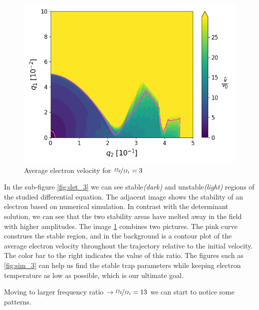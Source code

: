 \begin{figure}[H]
	\centering
	\includegraphics[width=\linewidth]{img/0_ions_1_electrons_q1_0.0-0.1_q2_0.0-0.5_960x960_3_1000.png}
	\caption{Average electron velocity for $\nicefrac{\Omega_2}{\Omega_1} = 3$}
	\label{fig:velocityedge-eta=3}
\end{figure}

In the sub-figure \ref{fig:det_3} we can see stable\textit{(dark)} and unstable\textit{(light)} regions of the studied differential equation. The adjacent image shows the stability of an electron based on numerical simulation. In contrast with the determinant solution, we can see that the two stability areas have melted away in the field with higher amplitudes. The image \ref{fig:velocityedge-eta=3} combines two pictures. The pink curve construes the stable region, and in the background is a contour plot of the average electron velocity throughout the trajectory relative to the initial velocity. The color bar to the right indicates the value of this ratio. The figures such as \ref{fig:sim_3} can help us find the stable trap parameters while keeping electron temperature as low as possible, which is our ultimate goal.

Moving to larger frequency ratio $\rightarrow \nicefrac{\Omega_2}{\Omega_1} = 13$ we can start to notice some patterns.

